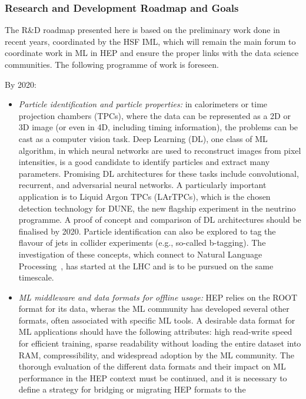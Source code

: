 \subsubsection*{Research and Development Roadmap and Goals}

The R\&D roadmap presented here is based on the preliminary work done in
recent years, coordinated by the HSF IML, which will remain the main
forum to coordinate work in ML in HEP and ensure the proper links
with the data science communities. The following programme of work is
foreseen.

By 2020:
\begin{itemize}
\item
  \emph{Particle identification and particle properties:} in calorimeters or
  time projection chambers (TPCs), where the data can be represented as
  a 2D or 3D image (or even in 4D, including timing information), the
  problems can be cast as a computer vision task. Deep Learning (DL),
  one class of ML algorithm, in which neural networks are used to
  reconstruct images from pixel intensities, is a good candidate to
  identify particles and extract many parameters. Promising DL
  architectures for these tasks include convolutional, recurrent, and
  adversarial neural networks. A particularly important application is
  to Liquid Argon TPCs (LArTPCs), which is the chosen detection
  technology for DUNE, the new flagship experiment in the neutrino programme. 
  A proof of
  concept and comparison of DL architectures should be finalised by
  2020. Particle identification can also be explored to tag the flavour
  of jets in collider experiments (e.g., so-called b-tagging). The
  investigation of these concepts, which connect to Natural Language
  Processing~\cite{Collobert:2011:NLP:1953048.2078186}, has started at the LHC and is to be pursued on the same
  timescale.
\item
  \emph{ML middleware and data formats for offline usage:} HEP relies 
  on the ROOT format for its data, wheras the ML community
  has developed several other formats, often associated with specific ML
  tools. A desirable data format for ML applications should have the
  following attributes: high read-write speed for efficient training,
  sparse readability without loading the entire dataset into RAM,
  compressibility, and widespread adoption by the ML community. The thorough
  evaluation of the different data formats and their impact on ML
  performance in the HEP context must be continued, and it is necessary
  to define a strategy for bridging or migrating HEP formats to the

\end{itemize}
